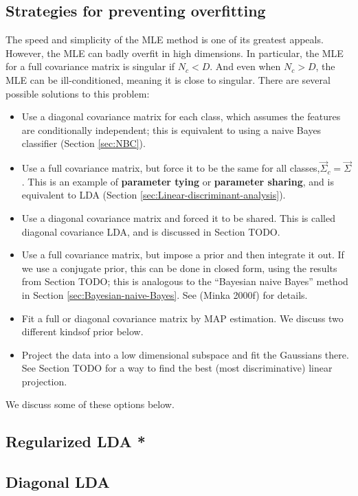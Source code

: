 \subsection{Strategies for preventing overfitting}
The speed and simplicity of the MLE method is one of its greatest appeals. However, the MLE can badly overfit in high dimensions. In particular, the MLE for a full covariance matrix is singular if $N_c <D$. And even when $N_c >D$, the MLE can be ill-conditioned, meaning it is close to singular. There are several possible solutions to this problem:
\begin{itemize}
\item{Use a diagonal covariance matrix for each class, which assumes the features are conditionally independent; this is equivalent to using a naive Bayes classifier (Section \ref{sec:NBC})}.
\item{Use a full covariance matrix, but force it to be the same for all classes,$\vec{\Sigma}_c=\vec{\Sigma}$. This is an example of \textbf{parameter tying} or \textbf{parameter sharing}, and is equivalent to LDA (Section \ref{sec:Linear-discriminant-analysis}).}
\item{Use a diagonal covariance matrix and forced it to be shared. This is called diagonal covariance LDA, and is discussed in Section TODO.}
\item{Use a full covariance matrix, but impose a prior and then integrate it out. If we use a conjugate prior, this can be done in closed form, using the results from Section TODO; this is analogous to the “Bayesian naive Bayes” method in Section \ref{sec:Bayesian-naive-Bayes}. See (Minka 2000f) for details.}
\item{Fit a full or diagonal covariance matrix by MAP estimation. We discuss two different kindsof prior below.}
\item{Project the data into a low dimensional subspace and fit the Gaussians there. See Section TODO for a way to find the best (most discriminative) linear projection.}
\end{itemize}

We discuss some of these options below.


\subsection{Regularized LDA *}


\subsection{Diagonal LDA}


